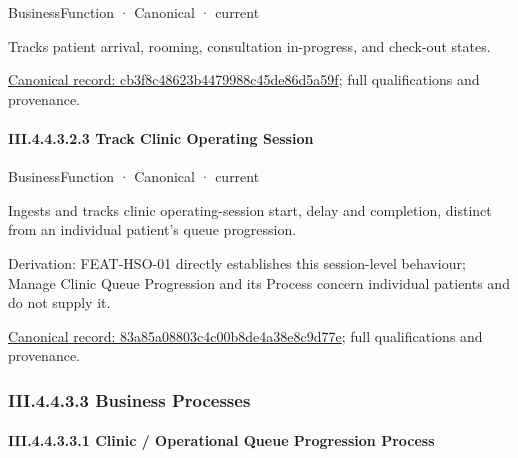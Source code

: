 \label{element:cb3f8c48623b4479988c45de86d5a59f}
{\small BusinessFunction · Canonical · current}\par

Tracks patient arrival, rooming, consultation in-progress, and check-out states.


{\footnotesize \href{../../../../continuum/business/business-function/cb3f8c48623b4479988c45de86d5a59f.md}{Canonical record: cb3f8c48623b4479988c45de86d5a59f}; full qualifications and provenance.}\par
\paragraph*{III.4.4.3.2.3 Track Clinic Operating Session}
\label{navigation:III.4.4.3.2.3}

\label{element:83a85a08803c4c00b8de4a38e8c9d77e}
{\small BusinessFunction · Canonical · current}\par

Ingests and tracks clinic operating-session start, delay and completion, distinct from an individual patient's queue progression.



Derivation: FEAT-HSO-01 directly establishes this session-level behaviour; Manage Clinic Queue Progression and its Process concern individual patients and do not supply it.


{\footnotesize \href{../../../../continuum/business/business-function/83a85a08803c4c00b8de4a38e8c9d77e.md}{Canonical record: 83a85a08803c4c00b8de4a38e8c9d77e}; full qualifications and provenance.}\par
\subsubsection*{III.4.4.3.3 Business Processes}
\label{navigation:III.4.4.3.3}

\paragraph*{III.4.4.3.3.1 Clinic / Operational Queue Progression Process}
\label{navigation:III.4.4.3.3.1}

